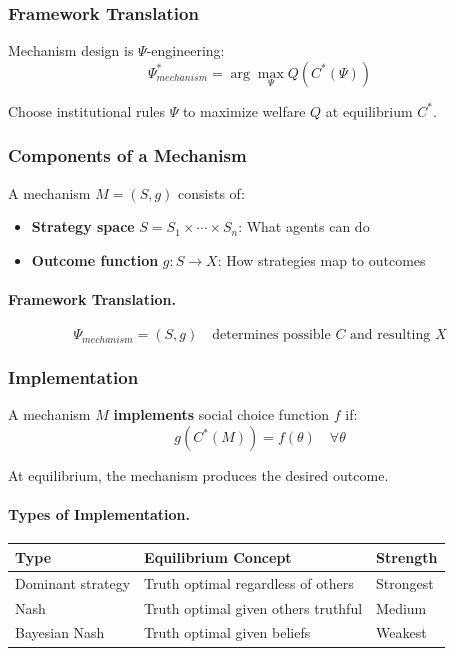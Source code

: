 \subsubsection{Framework Translation}

Mechanism design is $\Psi$-engineering:
\begin{equation}
\boxed{
\Psi_{mechanism}^* = \arg\max_{\Psi} Q(C^*(\Psi))
}
\label{eq:psi-design}
\end{equation}

Choose institutional rules $\Psi$ to maximize welfare $Q$ at equilibrium $C^*$.

\subsubsection{Components of a Mechanism}

A mechanism $M = (S, g)$ consists of:
\begin{itemize}
    \item \textbf{Strategy space} $S = S_1 \times \cdots \times S_n$: What agents can do
    \item \textbf{Outcome function} $g: S \to X$: How strategies map to outcomes
\end{itemize}

\paragraph{Framework Translation.}
\begin{equation}
\Psi_{mechanism} = (S, g) \quad \text{determines possible } C \text{ and resulting } X
\end{equation}

\subsubsection{Implementation}

A mechanism $M$ \textbf{implements} social choice function $f$ if:
\begin{equation}
g(C^*(M)) = f(\theta) \quad \forall \theta
\end{equation}

At equilibrium, the mechanism produces the desired outcome.

\paragraph{Types of Implementation.}
\begin{center}
\renewcommand{\arraystretch}{1.3}
\begin{tabular}{|l|l|l|}
\hline
\textbf{Type} & \textbf{Equilibrium Concept} & \textbf{Strength} \\
\hline
Dominant strategy & Truth optimal regardless of others & Strongest \\
Nash & Truth optimal given others truthful & Medium \\
Bayesian Nash & Truth optimal given beliefs & Weakest \\
\hline
\end{tabular}
\end{center}

